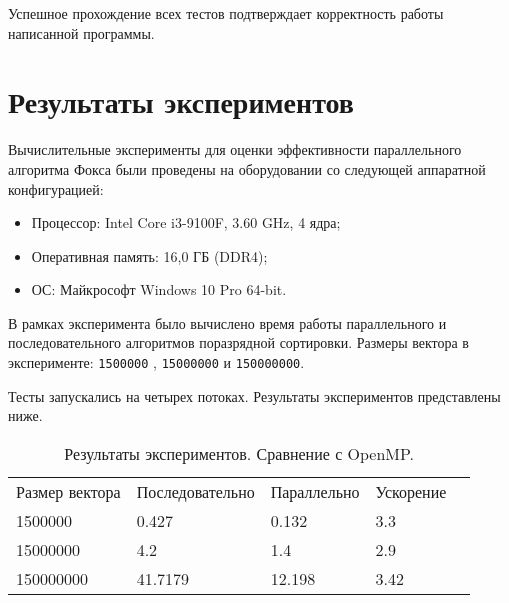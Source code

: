 \documentclass{report}
\begin{document}
\par Успешное прохождение всех тестов подтверждает корректность работы написанной программы.
\newpage

\section*{Результаты экспериментов}
Вычислительные эксперименты для оценки эффективности параллельного алгоритма Фокса были проведены на оборудовании со следующей аппаратной конфигурацией:

\begin{itemize}
\item Процессор: Intel Core i3-9100F, 3.60 GHz, 4 ядра;
\item Оперативная память: 16,0 ГБ (DDR4);
\item ОС: Майкрософт Windows 10 Pro 64-bit.
\end{itemize}

\par В рамках эксперимента было вычислено время работы параллельного
и последовательного алгоритмов поразрядной сортировки. Размеры вектора в эксперименте: \verb|1500000| , \verb|15000000| и \verb|150000000|.
\par  Тесты запускались на четырех потоках. Результаты экспериментов представлены ниже.

\begin{table}[!h]
\caption{Результаты экспериментов. Сравнение с OpenMP.}
\centering
\begin{tabular}{lllll}
Размер вектора & Последовательно & Параллельно & Ускорение  \\
1500000        & 0.427         & 0.132     & 3.3       \\
15000000        & 4.2         & 1.4     & 2.9       \\
150000000       & 41.7179         & 12.198     & 3.42       
\end{tabular}
\end{table}
\end{document}
